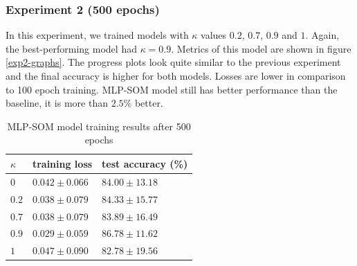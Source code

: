 \subsubsection{Experiment 2 (500 epochs)}
In this experiment, we trained models with $\kappa$ values $0.2$, $0.7$, $0.9$ and $1$. Again, the best-performing model had $\kappa = 0.9$. Metrics of this model are shown in figure \ref{exp2-graphs}. The progress plots look quite similar to the previous experiment and the final accuracy is higher for both models. Losses are lower in comparison to 100 epoch training. MLP-SOM model still has better performance than the baseline, it is more than $2.5\%$ better.

\begin{table}[h!]
\centering
\begin{tabular}{|l|l|l|}
\hline
$\kappa$        & training loss & test accuracy (\%) \\ \hline
\color{purple}$0$   &  \color{purple} $0.042	\pm 0.066 $  &  \color{purple} $84.00	\pm 13.18$  \\ \hline
$0.2$ &   $0.038	\pm 0.079 $  &  $84.33	\pm 15.77$  \\ \hline
$0.7$ &   $0.038	\pm 0.079 $  &  $83.89	\pm 16.49$  \\ \hline
\color{purple} $0.9$ &  \color{purple} $0.029	\pm 0.059 $  & \color{purple} $86.78	\pm 11.62$  \\ \hline
$1$   &   $0.047	\pm 0.090 $  &  $82.78	\pm 19.56$  \\ \hline
\end{tabular}
\caption{MLP-SOM model training results after 500 epochs}
\label{exp2-res-table}
\end{table}


